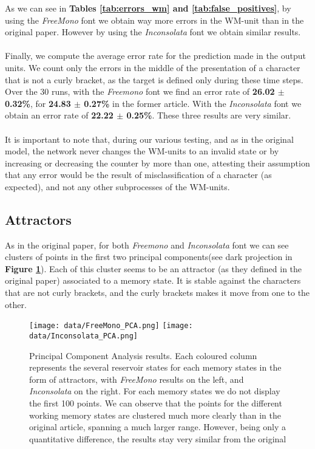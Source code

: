 As we can see in \textbf{Tables \ref{tab:errors_wm} and \ref{tab:false_positives}}, by using the \textit{FreeMono} font we obtain way more errors in the WM-unit than in the original paper. However by using the \textit{Inconsolata} font we obtain similar results. \\
\\
Finally, we compute the average error rate for the prediction made in the output units. We count only the errors in the middle of the presentation of a character that is not a curly bracket, as the target is defined only during these time steps.
Over the 30 runs, with the \textit{Freemono} font we find an error rate of \textbf{26.02 $\pm$ 0.32\%}, for \textbf{24.83 $\pm$ 0.27\%} in the former article. With the \textit{Inconsolata} font we obtain an error rate of \textbf{22.22 $\pm$ 0.25\%}. These three results are very similar. \\
\\
It is important to note that, during our various testing, and as in the original model, the network never changes the WM-units to an invalid state or by increasing or decreasing the counter by more than one, attesting their assumption that any error would be the result of misclassification of a character (as expected), and not any other subprocesses of the WM-units.

\subsection{Attractors}

As in the original paper, for both \textit{Freemono} and \textit{Inconsolata} font we can see clusters of points in the first two principal components(see dark projection in \textbf{Figure \ref{fig:PCA}}). Each of this cluster seems to be an attractor (as they defined in the original paper) associated to a memory state. It is stable against the characters that are not curly brackets, and the curly brackets makes it move from one to the other.

\begin{figure}[h]
    \centering
    \texttt{[image: data/FreeMono\_PCA.png]}
    \texttt{[image: data/Inconsolata\_PCA.png]}
    \caption{Principal Component Analysis results. Each coloured column represents the several reservoir states for each memory states in the form of attractors, with \textit{FreeMono} results on the left, and \textit{Inconsolata} on the right. For each memory states we do not display the first 100 points. We can observe that the points for the different working memory states are clustered much more clearly than in the original article, spanning a much larger range. However, being only a quantitative difference, the results stay very similar from the original}
    \label{fig:PCA}
\end{figure}

